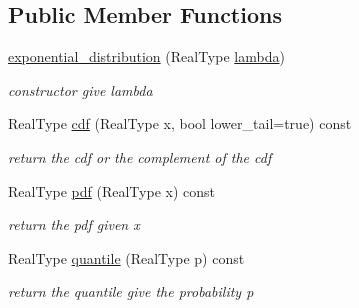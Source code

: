 \subsection*{Public Member Functions}
\begin{DoxyCompactItemize}
\item 
\mbox{\label{structexponential__distribution_a7524afbe4ae135246eec0b9900e5fb74}} 
\mbox{\hyperlink{structexponential__distribution_a7524afbe4ae135246eec0b9900e5fb74}{exponential\+\_\+distribution}} (Real\+Type \mbox{\hyperlink{structexponential__distribution_a7fcde2f1a6cd1aee2c13300df3663a2f}{lambda}})
\begin{DoxyCompactList}\small\item\em constructor give lambda \end{DoxyCompactList}\item 
\mbox{\label{structexponential__distribution_af1d1176f210ca6d4172e916fa71d5266}} 
Real\+Type \mbox{\hyperlink{structexponential__distribution_af1d1176f210ca6d4172e916fa71d5266}{cdf}} (Real\+Type x, bool lower\+\_\+tail=true) const
\begin{DoxyCompactList}\small\item\em return the cdf or the complement of the cdf \end{DoxyCompactList}\item 
\mbox{\label{structexponential__distribution_a1156a5414644c632e98384e09c540a97}} 
Real\+Type \mbox{\hyperlink{structexponential__distribution_a1156a5414644c632e98384e09c540a97}{pdf}} (Real\+Type x) const
\begin{DoxyCompactList}\small\item\em return the pdf given x \end{DoxyCompactList}\item 
\mbox{\label{structexponential__distribution_abaebff9dc27bac0b87dfa5fcc8acdb76}} 
Real\+Type \mbox{\hyperlink{structexponential__distribution_abaebff9dc27bac0b87dfa5fcc8acdb76}{quantile}} (Real\+Type p) const
\begin{DoxyCompactList}\small\item\em return the quantile give the probability p \end{DoxyCompactList}\item 

\end{DoxyCompactItemize}
